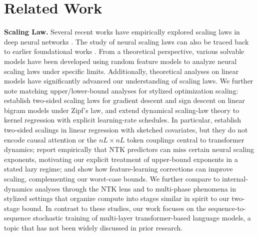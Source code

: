 \documentclass[11pt]{article}
\let\citet\citep
\theoremstyle{plain}
\begin{document}
\ifdefined\isarxiv
\section{Related Work}\label{sec:ralted_work}
{\bf Scaling Law.}
Several recent works have empirically explored scaling laws in deep neural networks \citep{kmh+20, hbm+22, rfcs21, hna+17, rrbs19, hka+20, mka18, mas+23, sos+22, niu2024beyond, ivgi2022scaling, petrov2025closing, mehta2025scaling, bi2025scaling, cagnetta2025scaling, havrilla2024understanding, kas+25}. The study of neural scaling laws can also be traced back to earlier foundational works \citep{cd07, shs+09, at88}. From a theoretical perspective, various solvable models have been developed using random feature models \citep{bdk+24, mrs22, abp+21, azvp24, bap24, ppxp24, dlm24, clkz21} to analyze neural scaling laws under specific limits. Additionally, theoretical analyses on linear models \citep{whs22, bcp20, sk22, bp21, lwk+24, lwz25} have significantly advanced our understanding of scaling laws. We further note matching upper/lower-bound analyses for stylized optimization scaling: \citet{kb25} establish two-sided scaling laws for gradient descent and sign descent on linear bigram models under Zipf's law, and \citet{azpf25} extend dynamical scaling-law theory to kernel regression with explicit learning-rate schedules. In particular, \citet{lwk+24} establish two-sided scalings in linear regression with sketched covariates, but they do not encode causal attention or the $nL\times nL$ token couplings central to transformer dynamics; \citet{vbn22} report empirically that NTK predictors can miss certain neural scaling exponents, motivating our explicit treatment of upper-bound exponents in a stated lazy regime; and \citet{boc+25} show how feature-learning corrections can improve scaling, complementing our worst-case bounds. We further compare to internal-dynamics analyses through the NTK lens \citep{nik+25} and to multi-phase phenomena in stylized settings \citep{lyu+23} that organize compute into stages similar in spirit to our two-stage bound. In contrast to these studies, our work focuses on the sequence-to-sequence stochastic training of multi-layer transformer-based language models, a topic that has not been widely discussed in prior research.
\end{document}
